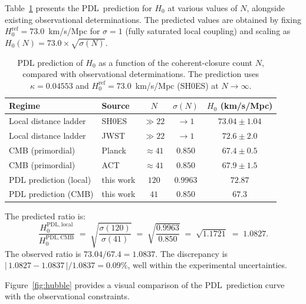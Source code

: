 \documentclass[11pt,a4paper]{article}
\theoremstyle{definition}
\newcommand{\PDL}{\textnormal{PDL}}
\newcommand{\Hzero}{H_0}
\newcommand{\kap}{\kappa}
\newcommand{\sig}{\sigma}
\begin{document}
Table~\ref{tab:H0_comparison} presents the \PDL\ prediction for $\Hzero$ at various values of $N$, alongside existing observational determinations. The predicted values are obtained by fixing $\Hzero^{\mathrm{ref}} = 73.0$~km/s/Mpc for $\sig = 1$ (fully saturated local coupling) and scaling as $\Hzero(N) = 73.0 \times \sqrt{\sig(N)}$.

\begin{table}[ht]
\centering
\caption{PDL prediction of $\Hzero$ as a function of the coherent-closure count $N$, compared with observational determinations. The prediction uses $\kap = 0.04553$ and $\Hzero^{\mathrm{ref}} = 73.0$~km/s/Mpc (SH0ES) at $N \to \infty$.}
\label{tab:H0_comparison}
\bigskip
\begin{tabular}{llccc}
\toprule
Regime & Source & $N$ & $\sig(N)$ & $\Hzero$ (km/s/Mpc) \\
\midrule
Local distance ladder & SH0ES~\cite{Riess_2022} & $\gg 22$ & $\to 1$ & $73.04 \pm 1.04$ \\
Local distance ladder & JWST~\cite{Freedman_2024} & $\gg 22$ & $\to 1$ & $72.6 \pm 2.0$ \\
CMB (primordial) & Planck~\cite{Planck_2020} & $\approx 41$ & $0.850$ & $67.4 \pm 0.5$ \\
CMB (primordial) & ACT~\cite{ACT_2020} & $\approx 41$ & $0.850$ & $67.9 \pm 1.5$ \\
\midrule
PDL prediction (local) & this work & $120$ & $0.9963$ & $72.87$ \\
PDL prediction (CMB) & this work & $41$ & $0.850$ & $67.3$ \\
\bottomrule
\end{tabular}
\end{table}

The predicted ratio is:
\begin{equation}
  \label{eq:ratio_pred}
  \frac{\Hzero^{\mathrm{PDL,local}}}{\Hzero^{\mathrm{PDL,CMB}}} \;=\; \sqrt{\frac{\sig(120)}{\sig(41)}} \;=\; \sqrt{\frac{0.9963}{0.850}} \;=\; \sqrt{1.1721} \;=\; 1.0827.
\end{equation}
The observed ratio is $73.04/67.4 = 1.0837$. The discrepancy is $|\,1.0827 - 1.0837\,|/1.0837 = 0.09\%$, well within the experimental uncertainties.

Figure~\ref{fig:hubble} provides a visual comparison of the \PDL\ prediction curve with the observational constraints.
\end{document}
